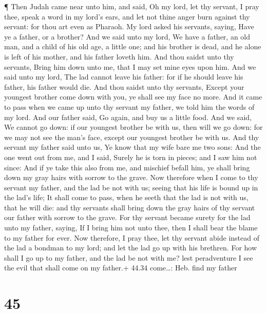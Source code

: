  ¶ Then Judah came near unto him, and said, Oh my lord, let
thy servant, I pray thee, speak a word in my lord's ears, and let not
thine anger burn against thy servant: for thou art even as Pharaoh.
 My lord asked his servants, saying, Have ye a father, or a
brother?  And we said unto my lord, We have a father, an
old man, and a child of his old age, a little one; and his brother is
dead, and he alone is left of his mother, and his father loveth him.
 And thou saidst unto thy servants, Bring him down unto me,
that I may set mine eyes upon him.  And we said unto my
lord, The lad cannot leave his father: for if he should leave his
father, his father would die.  And thou saidst unto thy
servants, Except your youngest brother come down with you, ye shall see
my face no more.  And it came to pass when we came up unto
thy servant my father, we told him the words of my lord. 
And our father said, Go again, and buy us a little food. 
And we said, We cannot go down: if our youngest brother be with us, then
will we go down: for we may not see the man's face, except our youngest
brother be with us.  And thy servant my father said unto
us, Ye know that my wife bare me two sons:  And the one
went out from me, and I said, Surely he is torn in pieces; and I saw him
not since:  And if ye take this also from me, and mischief
befall him, ye shall bring down my gray hairs with sorrow to the grave.
 Now therefore when I come to thy servant my father, and
the lad be not with us; seeing that his life is bound up in the lad's
life;  It shall come to pass, when he seeth that the lad is
not with us, that he will die: and thy servants shall bring down the
gray hairs of thy servant our father with sorrow to the grave.
 For thy servant became surety for the lad unto my father,
saying, If I bring him not unto thee, then I shall bear the blame to my
father for ever.  Now therefore, I pray thee, let thy
servant abide instead of the lad a bondman to my lord; and let the lad
go up with his brethren.  For how shall I go up to my
father, and the lad be not with me? lest peradventure I see the evil
that shall come on my father.+ 44.34 come\ldots: Heb. find my father

\hypertarget{section-44}{%
\section{45}\label{section-44}}

